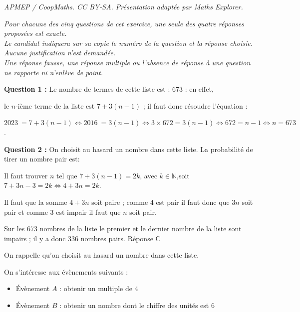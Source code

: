 \documentclass[10pt]{article}
\providecommand{\N}{\mathbb{N}}
\providecommand{\np}[2][]{{#2~#1}}
\begin{document}
\noindent\textit{APMEP / CoopMaths. CC BY-SA. Présentation adaptée par Maths Explorer.}\par\medskip
\medskip

\emph{Pour chacune des cinq questions de cet exercice, une seule des quatre réponses proposées est exacte.\\Le candidat indiquera sur sa copie le numéro de la question et la réponse choisie.\\
Aucune justification n'est demandée.\\
Une réponse fausse, une réponse multiple ou l'absence de réponse à une question ne rapporte ni n'enlève de point.}

\medskip





\textbf{Question 1 :} Le nombre de termes de cette liste est : 673 : en effet,

le $n$-ième terme de la liste est $7 + 3(n - 1)$ ; il faut donc résoudre l'équation :

$\np{2023} = 7 + 3(n - 1) \iff \np{2016} = 3(n - 1) \iff 3 \times 672 = 3(n - 1) \iff 672 = n - 1 \iff n = 673$.








\textbf{Question 2 :} On choisit au hasard un nombre dans cette liste. La probabilité de tirer un nombre pair est:







Il faut trouver $n$ tel que $7 + 3(n - 1) = 2k$, avec $k \in \N$,soit $7 + 3n - 3 = 2k \iff 4 + 3n = 2k$.

Il faut que la somme $4 + 3n$ soit paire ; comme 4 est pair il faut donc que $3n$ soit pair et comme 3 est impair il faut que $n$ soit pair.

Sur les 673 nombres de la liste le premier et le dernier nombre de la liste sont impairs ; il y a donc 336 nombres pairs. Réponse C
\medskip

On rappelle qu'on choisit au hasard un nombre dans cette liste. 

On s'intéresse aux évènements suivants :
\begin{itemize}
\item[$\bullet~~$]Évènement $A$ : \og obtenir un multiple de 4 \fg
\item[$\bullet~~$]Évènement $B$ : \og obtenir un nombre dont le chiffre des unités est 6 \fg
\end{itemize}
\end{document}
